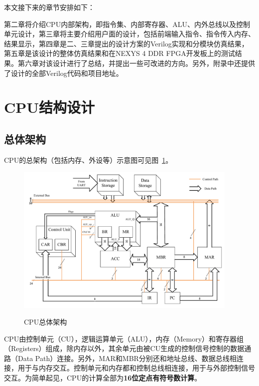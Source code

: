 \documentclass[lang=cn,a4paper,newtx]{elegantpaper}
\begin{document}
本文接下来的章节安排如下：

第二章将介绍CPU内部架构，即指令集、内部寄存器、ALU、内外总线以及控制单元设计，第三章将主要介绍用户面的设计，包括前端输入指令、指令传入内存、结果显示，第四章是二、三章提出的设计方案的Verilog实现和分模块仿真结果，第五章是该设计的整体仿真结果和在NEXYS 4 DDR FPGA开发板上的测试结果。第六章对该设计进行了总结，并提出一些可改进的方向。另外，附录中还提供了设计的全部Verilog代码和项目地址。


\section{CPU结构设计}
\subsection{总体架构}

CPU的总架构（包括内存、外设等）示意图可见图~\ref{fig:CPU}。
\begin{figure}[htbp]
  \centering
  \caption{CPU总体架构}
  \includegraphics[width = 0.95\textwidth]{figure/CPU_structure.pdf}
  \label{fig:CPU}
\end{figure}

CPU由控制单元（CU），逻辑运算单元（ALU），内存（Memory）和寄存器组（Registers）组成，除内存以外，其余单元由被CU生成的控制信号控制的数据通路（Data Path）连接。另外，MAR和MBR分别还和地址总线、数据总线相连接，用于与内存交互。控制单元和内存都和控制总线相连接，用于与外部控制信号交互。为简单起见，CPU的计算全部为\textbf{16位定点有符号数计算}。
\end{document}
